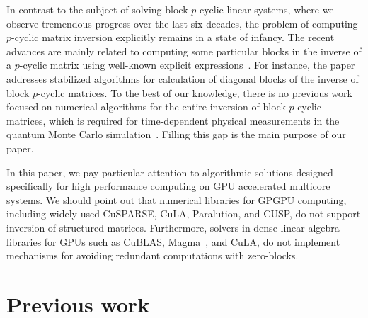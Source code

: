 \documentclass{llncs}
\newcommand{\Blas}{{\sc BLAS}\xspace}
\newcommand{\CuBlas}{{\sc Cu\Blas}\xspace}
\newcommand{\CuSparse}{{\sc CuSPARSE}\xspace}
\newcommand{\Magma}{{\sc Magma}\xspace}
\newcommand{\Cula}{{\sc CuLA}\xspace}
\newcommand{\Paralution}{{\sc Paralution}\xspace}
\newcommand{\Cusp}{{\sc CUSP}\xspace}
\begin{document}
In contrast to the subject of solving block $p$-cyclic linear systems, 
where we observe tremendous progress over the last six decades,
the problem of computing $p$-cyclic matrix inversion explicitly remains in 
a state of infancy. The recent advances are mainly related to 
computing some particular blocks in the inverse of a $p$-cyclic matrix
using well-known explicit expressions~\cite{Bai09}.
For instance, the paper~\cite{Tomas12} addresses stabilized algorithms for 
calculation of diagonal blocks of the inverse of block $p$-cyclic matrices. 
To the best of our knowledge, there is no previous work 
focused on numerical algorithms for the entire inversion of 
block $p$-cyclic matrices, which is required for 
time-dependent physical measurements 
in the quantum Monte Carlo simulation~\cite{Bai09}.
Filling this gap is the main purpose of our paper. 

In this paper, we pay particular attention to 
algorithmic solutions designed specifically for high performance computing 
on GPU accelerated multicore systems.
We should point out that numerical libraries for GPGPU computing,
including widely used 
\CuSparse, \Cula, \Paralution, and \Cusp, 
do not support inversion of structured matrices.
Furthermore, solvers in dense linear algebra libraries for GPUs 
such as \CuBlas,
\Magma~\cite{Tomov10Magma}, and \Cula,
do not implement mechanisms for avoiding redundant 
computations with zero-blocks.

\section{Previous work} 
\label{sec:background}
\end{document}
